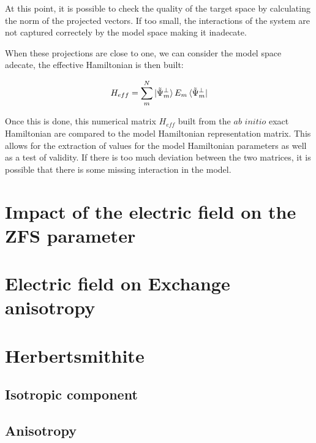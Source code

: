 \documentclass[12pt]{article}
\numberwithin{equation}{section}
\begin{document}
At this point, it is possible to check the quality of the target space by calculating the norm of the projected vectors.
If too small, the interactions of the system are not captured correctely by the model space making it inadecate. 
\par When these projections are close to one, we can consider the model space adecate, the effective Hamiltonian is then built:

\begin{equation}
    H_{eff}=\sum_{m}^{N}\ket{\tilde{\Psi}_m^{\bot}}E_m \bra{\tilde{\Psi}_m^{\bot}}
\end{equation}

Once this is done, this numerical matrix $H_{eff}$ built from the $\textit{ab}$ $\textit{initio}$ exact Hamiltonian are compared to the model Hamiltonian representation matrix. 
This allows for the extraction of values for the model Hamiltonian parameters as well as a test of validity.
If there is too much deviation between the two matrices, it is possible that there is some missing interaction in the model.

\section{Impact of the electric field on the ZFS parameter}

\section{Electric field on Exchange anisotropy}

\section{Herbertsmithite}

\subsection{Isotropic component}

\subsection{Anisotropy}
\end{document}
